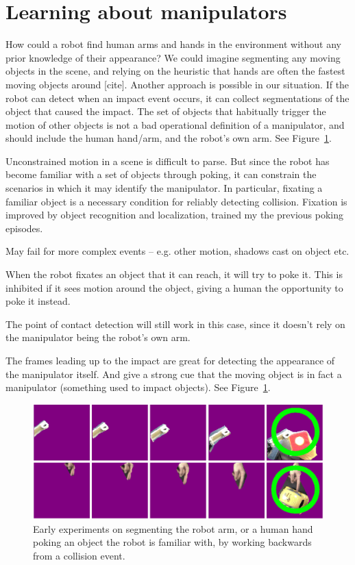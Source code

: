 
\section{Learning about manipulators}

How could a robot find human arms and hands in the environment without
any prior knowledge of their appearance?  We could imagine segmenting
any moving objects in the scene, and relying on the heuristic that
hands are often the fastest moving objects around [cite].
Another approach is possible in our situation.  If the robot can
detect when an impact event occurs, it can collect segmentations of the
object that caused the impact.  The set of objects that habitually
trigger the motion of other objects is not a bad operational 
definition of a manipulator, and should include the human hand/arm,
and the robot's own arm.  See Figure~\ref{fig:manipulator}.

\ifverbose

Unconstrained motion in a scene is difficult to parse.  But since the
robot has become familiar with a set of objects through poking, it can
constrain the scenarios in which it may identify the manipulator.  In
particular, fixating a familiar object is a necessary condition for
reliably detecting collision.  Fixation is improved by object recognition
and localization, trained my the previous poking episodes.

May fail for more complex events -- e.g. other motion, shadows cast on
object etc.

When the robot fixates an object that it can reach, it will try to poke it.
This is inhibited if it sees motion around the object, giving a human the
opportunity to poke it instead.

The point of contact detection will still work in this case, since it 
doesn't rely on the manipulator being the robot's own arm.

The frames leading up to the impact are great for detecting the
appearance of the manipulator itself.  And give a strong cue that the
moving object is in fact a manipulator (something used to impact
objects).  See Figure~\ref{fig:manipulator}.

\fi

\begin{figure}[tbh]
  \centerline{\includegraphics[width=12cm]{manipulator-segment}}
  \caption{Early experiments on segmenting the robot arm, or a 
human hand poking an object the robot is familiar with, by working
backwards from a collision event.}
  \label{fig:manipulator}
\end{figure}

